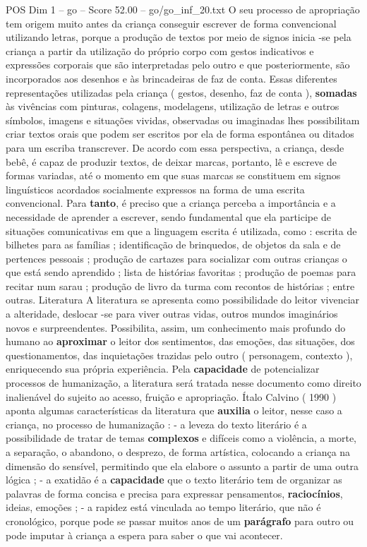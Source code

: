 \begin{textsample}{POS Dim 1 – go – Score 52.00 – go/go\_inf\_20.txt}
O seu processo de apropriação tem origem muito antes da criança conseguir escrever de forma convencional utilizando letras, porque a produção de textos por meio de signos inicia -se pela criança a partir da utilização do próprio corpo com gestos indicativos e expressões corporais que são interpretadas pelo outro e que posteriormente, são incorporados aos desenhos e às brincadeiras de faz de conta.
Essas diferentes representações utilizadas pela criança ( gestos, desenho, faz de conta ), \textbf{somadas} às vivências com pinturas, colagens, modelagens, utilização de letras e outros símbolos, imagens e situações vividas, observadas ou imaginadas lhes possibilitam criar textos orais que podem ser escritos por ela de forma espontânea ou ditados para um escriba transcrever.
De acordo com essa perspectiva, a criança, desde bebê, é capaz de produzir textos, de deixar marcas, portanto, lê e escreve de formas variadas, até o momento em que suas marcas se constituem em signos linguísticos acordados socialmente expressos na forma de uma escrita convencional.
Para \textbf{tanto}, é preciso que a criança perceba a importância e a necessidade de aprender a escrever, sendo fundamental que ela participe de situações comunicativas em que a linguagem escrita é utilizada, como : escrita de bilhetes para as famílias ; identificação de brinquedos, de objetos da sala e de pertences pessoais ; produção de cartazes para socializar com outras crianças o que está sendo aprendido ; lista de histórias favoritas ; produção de poemas para recitar num sarau ; produção de livro da turma com recontos de histórias ; entre outras.
Literatura A literatura se apresenta como possibilidade do leitor vivenciar a alteridade, deslocar -se para viver outras vidas, outros mundos imaginários novos e surpreendentes.
Possibilita, assim, um conhecimento mais profundo do humano ao \textbf{aproximar} o leitor dos sentimentos, das emoções, das situações, dos questionamentos, das inquietações trazidas pelo outro ( personagem, contexto ), enriquecendo sua própria experiência.
Pela \textbf{capacidade} de potencializar processos de humanização, a literatura será tratada nesse documento como direito inalienável do sujeito ao acesso, fruição e apropriação.
Ítalo Calvino ( 1990 ) aponta algumas características da literatura que \textbf{auxilia} o leitor, nesse caso a criança, no processo de humanização : - a leveza do texto literário é a possibilidade de tratar de temas \textbf{complexos} e difíceis como a violência, a morte, a separação, o abandono, o desprezo, de forma artística, colocando a criança na dimensão do sensível, permitindo que ela elabore o assunto a partir de uma outra lógica ; - a exatidão é a \textbf{capacidade} que o texto literário tem de organizar as palavras de forma concisa e precisa para expressar pensamentos, \textbf{raciocínios}, ideias, emoções ; - a rapidez está vinculada ao tempo literário, que não é cronológico, porque pode se passar muitos anos de um \textbf{parágrafo} para outro ou pode imputar à criança a espera para saber o que vai acontecer.

\end{textsample}
